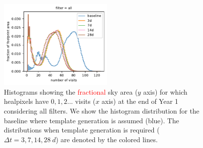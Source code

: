 \documentclass[preprintm,linenumbers]{aastex631}
\providecommand{\red}[1]{\textcolor{red}{#1}}
\begin{document}
		\begin{figure}
			\centering
			
			\includegraphics[width=0.5\textwidth]{results/histograms/hist_first_year_one_snap_v4_0_10yrs_db_noDD_noTwi_CountMetric_doAllTemplateMetrics_reduceCount_all_noDD_noTwi.pdf}
			
			\caption{
				Histograms showing the \red{fractional} sky area ($y$ axis) for which healpixels have $0, 1, 2...$ visits ($x$ axis) at the end of Year 1 considering all filters.
				We show the histogram distribution for the baseline where template generation is assumed (blue).
				The distributions when template generation is required ($\Delta t = 3, 7, 14, 28\ \si{d}$) are denoted by the colored lines.
			\label{fig:template_baseline_all}}
		\end{figure}
		
\end{document}
